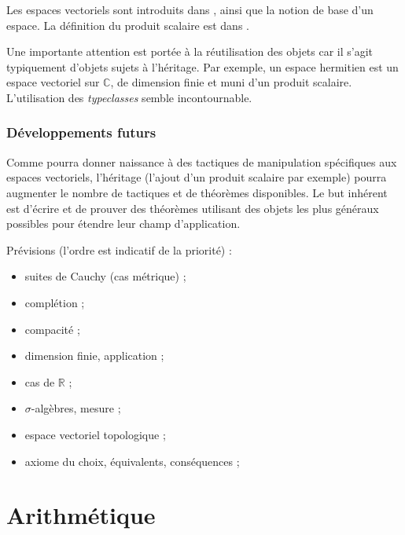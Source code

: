 Les espaces vectoriels sont introduits dans , ainsi que la notion de base d'un espace. La définition du produit scalaire est dans .

Une importante attention est portée à la réutilisation des objets car il s'agit typiquement d'objets sujets à l'héritage. Par exemple, un espace hermitien est un espace vectoriel sur $\mathbb{C}$, de dimension finie et muni d'un produit scalaire. L'utilisation des \emph{typeclasses} semble incontournable.


\subsubsection{Développements futurs}

Comme  pourra donner naissance à des tactiques de manipulation spécifiques aux espaces vectoriels, %
l'héritage (l'ajout d'un produit scalaire par exemple) pourra augmenter le nombre de tactiques et de théorèmes disponibles. Le but inhérent est d'écrire et de prouver des théorèmes utilisant des objets les plus généraux possibles pour étendre leur champ d'application.

Prévisions (l'ordre est indicatif de la priorité) :
\begin{itemize}
  \item suites de Cauchy (cas métrique) ;
  \item complétion ;
  \item compacité ;
  \item dimension finie, application ; %
  \item cas de $\mathbb{R}$ ;
  \item $\sigma$-algèbres, mesure ;
  \item espace vectoriel topologique ; %
  \item axiome du choix, équivalents, conséquences ; %
\end{itemize}

\section{Arithmétique}

